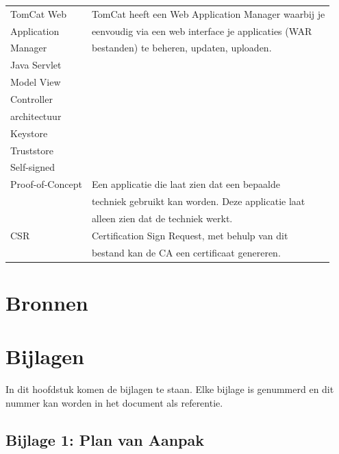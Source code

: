 \documentclass[]{article}
\begin{document}
\begin{tabular}{|| l | l ||}
    TomCat Web       & TomCat heeft een Web Application Manager waarbij je  \\
    Application      & eenvoudig via een web interface je applicaties (WAR  \\
    Manager          & bestanden) te beheren, updaten, uploaden.            \\\hline
    Java Servlet     &                                                      \\\hline
    Model View       &                                                      \\
    Controller       &                                                      \\
    architectuur     &                                                      \\\hline
    Keystore         &                                                      \\\hline
    Truststore       &                                                      \\\hline
    Self-signed      &                                                      \\\hline
    Proof-of-Concept & Een applicatie die laat zien dat een bepaalde        \\
                     & techniek gebruikt kan worden. Deze applicatie laat   \\
                     & alleen zien dat de techniek werkt.                   \\\hline
    CSR              & Certification Sign Request, met behulp van dit       \\
                     & bestand kan de CA een certificaat genereren.         \\\hline
\end{tabular}

\newpage
\section{Bronnen}

\newpage
\section{Bijlagen}

In dit hoofdstuk komen de bijlagen te staan. Elke bijlage is genummerd en
dit nummer kan worden in het document als referentie.

\subsection{Bijlage 1: Plan van Aanpak}
\end{document}
